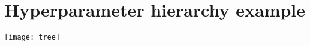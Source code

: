 \appendix
\chapter{Hyperparameter hierarchy example}
	\label{ap:hyperparam_hierarchy}

\texttt{[image: tree]}
